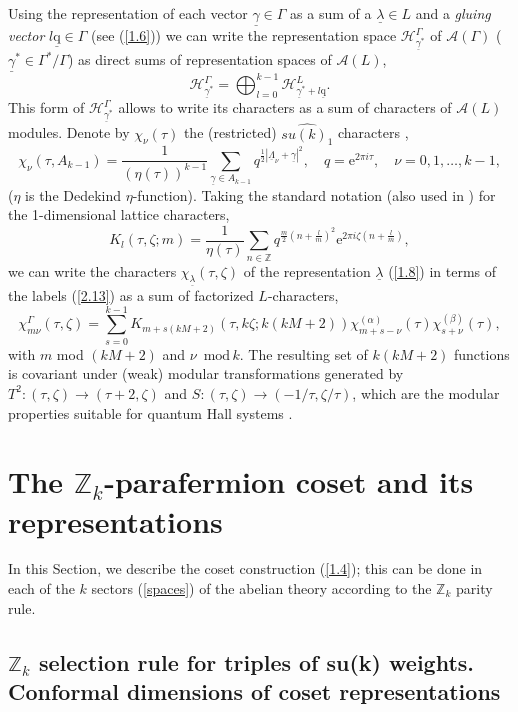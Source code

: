 \documentclass[a4paper,12pt]{article}
\newcommand{\clth}{\setcounter{thm}{0}}
\newcommand{\sectionnew}[1]{\section{#1}\clth}
\newcommand{\beq}{\begin{equation}}
\newcommand{\eeq}{\end{equation}}
\def \l {\underline{\lambda}}
\def \L {\underline{\Lambda}}
\def \q {\underline{\mathrm{q}}}
\def \ex {\mathrm{e}}
\def \h {\frac{1}{2}}
\def \z {\zeta}
\def \A {{\mathcal A} }
\def \g {\underline{\gamma}}
\def \t {\tau}
\def \H {{\mathcal H}}
\def \Z {{\mathbb Z}}
\def \G   {\Gamma}
\def \mod {\, \mathrm{mod}\, }
\begin{document}
Using the representation of each vector $\g\in \G$ as a sum
of a $\l\in L$ and a {\it gluing vector} \cite{fro} $l \q\in \G$
(see (\ref{1.6})) we can write the representation space
$\H^\G_{\g^*}$ of $\A(\G)$ ($\g^*\in\G^* /\G$)
as direct sums of representation spaces of $\A(L)$,
\beq\label{spaces}
 \H^\G_{\g^*} = \bigoplus_{l=0}^{k-1} \H^L_{\g^*+l\q}.
\eeq
This form of $\H^\G_{\g^*}$ allows to write its characters
as a sum of characters of $\A(L)$ modules.
Denote by $\chi_\nu(\t)$ the (restricted)  $\widehat{su(k)_1}$ characters
\cite{kt},
\beq\label{1.16}
\chi_\nu(\t,A_{k-1})=\frac{1}{(\eta(\t))^{k-1}}
\sum_{\g\in A_{k-1}} q^{\h|\L_\nu +\g|^2}, \quad q=\ex^{2\pi i \t},
\quad \nu=0,1,\ldots, k-1,
\eeq
($\eta$ is the Dedekind $\eta$-function). Taking the standard
notation (also used in \cite{cgt}) for the 1-dimensional lattice characters,
\beq\label{1.17}
K_l(\t,\zeta;m)=\frac{1}{\eta(\t)} \sum_{n\in\Z}
q^{\frac{m}{2}(n+\frac{l}{m})^2} \ex^{2\pi i \zeta (n+\frac{l}{m})},
\eeq
we can write the characters $\chi_{\l}(\t,\zeta)$
of the representation $\l$ (\ref{1.8}) in terms of the labels
(\ref{2.13})
as a sum of factorized $L$-characters,
\beq\label{1.18}
\chi_{m \nu}^\G(\t,\zeta)= 
\sum_{s=0}^{k-1} K_{m +s(kM+2)}\left(\t,k\zeta;k(kM+2)\right)
\chi_{m+s-\nu}^{(\alpha)}(\t)   \chi_{s+\nu}^{(\beta)}(\t),
\eeq
with $m$ mod $(kM+2)$ and $\nu$ $ \mod k $.
The resulting set of $k(kM+2)$ functions is covariant under (weak)
modular transformations generated by
$T^2: (\t,\zeta)\rightarrow (\t+2,\zeta)$ and
$S:(\t,\z) \rightarrow (-1/\t,\zeta/\t)$, which are the modular
properties suitable for quantum Hall systems \cite{cz}.



\sectionnew{The $\Z_k$-parafermion coset and its representations}

In this Section, we describe the coset construction (\ref{1.4});
this can be done in each of the $k$ sectors (\ref{spaces}) of the abelian
theory according to the $\Z_k$ parity rule.


\subsection{$\Z_k$ selection rule for triples of su(k) weights.
Conformal dimensions of coset representations}
\end{document}
